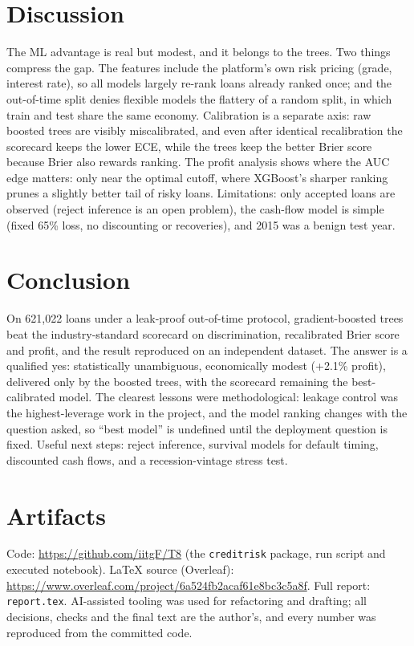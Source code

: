 \documentclass[a4paper,twocolumn,10pt]{article}
\begin{document}
\section{Discussion}
The ML advantage is real but modest, and it belongs to the trees. Two things compress the gap. The features include the platform's own risk pricing (grade, interest rate), so all models largely re-rank loans already ranked once; and the out-of-time split denies flexible models the flattery of a random split, in which train and test share the same economy. Calibration is a separate axis: raw boosted trees are visibly miscalibrated, and even after identical recalibration the scorecard keeps the lower ECE, while the trees keep the better Brier score because Brier also rewards ranking. The profit analysis shows where the AUC edge matters: only near the optimal cutoff, where XGBoost's sharper ranking prunes a slightly better tail of risky loans. Limitations: only accepted loans are observed (reject inference is an open problem), the cash-flow model is simple (fixed 65\% loss, no discounting or recoveries), and 2015 was a benign test year.

\section{Conclusion}
On 621{,}022 loans under a leak-proof out-of-time protocol, gradient-boosted trees beat the industry-standard scorecard on discrimination, recalibrated Brier score and profit, and the result reproduced on an independent dataset. The answer is a qualified yes: statistically unambiguous, economically modest (+2.1\% profit), delivered only by the boosted trees, with the scorecard remaining the best-calibrated model. The clearest lessons were methodological: leakage control was the highest-leverage work in the project, and the model ranking changes with the question asked, so ``best model'' is undefined until the deployment question is fixed. Useful next steps: reject inference, survival models for default timing, discounted cash flows, and a recession-vintage stress test.

\section{Artifacts}
Code: \url{https://github.com/iitgF/T8} (the \texttt{creditrisk} package, run script and executed notebook). LaTeX source (Overleaf): \url{https://www.overleaf.com/project/6a524fb2acaf61e8bc3c5a8f}. Full report: \texttt{report.tex}. AI-assisted tooling was used for refactoring and drafting; all decisions, checks and the final text are the author's, and every number was reproduced from the committed code.
\end{document}
